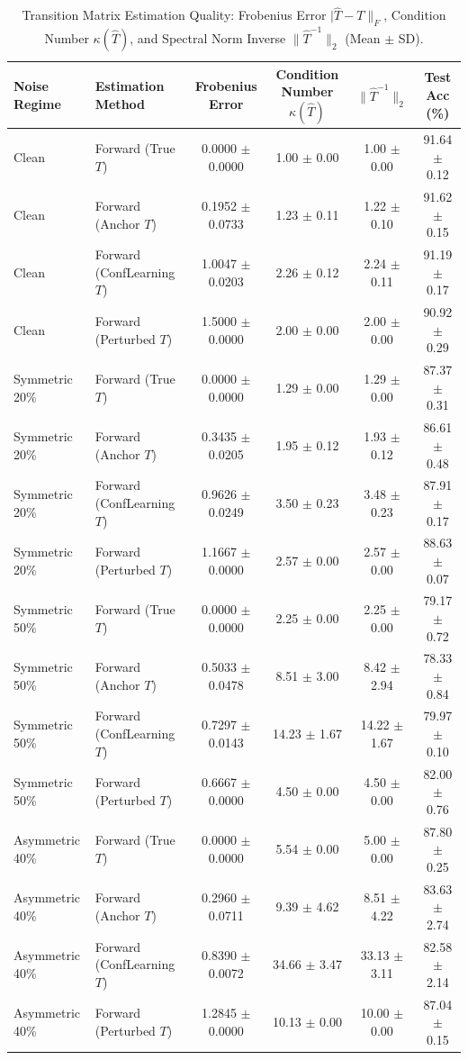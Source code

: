 \begin{table}[t]
\centering
\caption{Transition Matrix Estimation Quality: Frobenius Error $|\hat{T} - T\|_F$, Condition Number $\kappa(\hat{T})$, and Spectral Norm Inverse $\|\hat{T}^{-1}\|_2$ (Mean $\pm$ SD).}
\label{tab:matrix_estimation}
\small
\begin{tabular}{llcccc}
\hline
\textbf{Noise Regime} & \textbf{Estimation Method} & \textbf{Frobenius Error} & \textbf{Condition Number $\kappa(\hat{T})$} & \textbf{$\|\hat{T}^{-1}\|_2$} & \textbf{Test Acc (\%)} \\
\hline
Clean & Forward (True $T$) & 0.0000 $\pm$ 0.0000 & 1.00 $\pm$ 0.00 & 1.00 $\pm$ 0.00 & 91.64 $\pm$ 0.12 \\
Clean & Forward (Anchor $T$) & 0.1952 $\pm$ 0.0733 & 1.23 $\pm$ 0.11 & 1.22 $\pm$ 0.10 & 91.62 $\pm$ 0.15 \\
Clean & Forward (ConfLearning $T$) & 1.0047 $\pm$ 0.0203 & 2.26 $\pm$ 0.12 & 2.24 $\pm$ 0.11 & 91.19 $\pm$ 0.17 \\
Clean & Forward (Perturbed $T$) & 1.5000 $\pm$ 0.0000 & 2.00 $\pm$ 0.00 & 2.00 $\pm$ 0.00 & 90.92 $\pm$ 0.29 \\
\hline
Symmetric 20\% & Forward (True $T$) & 0.0000 $\pm$ 0.0000 & 1.29 $\pm$ 0.00 & 1.29 $\pm$ 0.00 & 87.37 $\pm$ 0.31 \\
Symmetric 20\% & Forward (Anchor $T$) & 0.3435 $\pm$ 0.0205 & 1.95 $\pm$ 0.12 & 1.93 $\pm$ 0.12 & 86.61 $\pm$ 0.48 \\
Symmetric 20\% & Forward (ConfLearning $T$) & 0.9626 $\pm$ 0.0249 & 3.50 $\pm$ 0.23 & 3.48 $\pm$ 0.23 & 87.91 $\pm$ 0.17 \\
Symmetric 20\% & Forward (Perturbed $T$) & 1.1667 $\pm$ 0.0000 & 2.57 $\pm$ 0.00 & 2.57 $\pm$ 0.00 & 88.63 $\pm$ 0.07 \\
\hline
Symmetric 50\% & Forward (True $T$) & 0.0000 $\pm$ 0.0000 & 2.25 $\pm$ 0.00 & 2.25 $\pm$ 0.00 & 79.17 $\pm$ 0.72 \\
Symmetric 50\% & Forward (Anchor $T$) & 0.5033 $\pm$ 0.0478 & 8.51 $\pm$ 3.00 & 8.42 $\pm$ 2.94 & 78.33 $\pm$ 0.84 \\
Symmetric 50\% & Forward (ConfLearning $T$) & 0.7297 $\pm$ 0.0143 & 14.23 $\pm$ 1.67 & 14.22 $\pm$ 1.67 & 79.97 $\pm$ 0.10 \\
Symmetric 50\% & Forward (Perturbed $T$) & 0.6667 $\pm$ 0.0000 & 4.50 $\pm$ 0.00 & 4.50 $\pm$ 0.00 & 82.00 $\pm$ 0.76 \\
\hline
Asymmetric 40\% & Forward (True $T$) & 0.0000 $\pm$ 0.0000 & 5.54 $\pm$ 0.00 & 5.00 $\pm$ 0.00 & 87.80 $\pm$ 0.25 \\
Asymmetric 40\% & Forward (Anchor $T$) & 0.2960 $\pm$ 0.0711 & 9.39 $\pm$ 4.62 & 8.51 $\pm$ 4.22 & 83.63 $\pm$ 2.74 \\
Asymmetric 40\% & Forward (ConfLearning $T$) & 0.8390 $\pm$ 0.0072 & 34.66 $\pm$ 3.47 & 33.13 $\pm$ 3.11 & 82.58 $\pm$ 2.14 \\
Asymmetric 40\% & Forward (Perturbed $T$) & 1.2845 $\pm$ 0.0000 & 10.13 $\pm$ 0.00 & 10.00 $\pm$ 0.00 & 87.04 $\pm$ 0.15 \\
\hline
\end{tabular}
\end{table}
